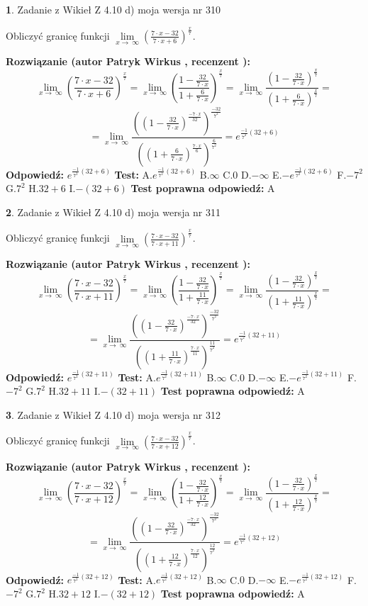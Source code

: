 \documentclass[12pt, a4paper]{article}
\theoremstyle{definition} %
\newtheorem{zad}{}
\newcommand{\zadStart}[1]{\begin{zad}#1\newline}
\newcommand{\zadStop}{\end{zad}}
\newcommand{\rozwStart}[2]{\noindent \textbf{Rozwiązanie (autor #1 , recenzent #2): }\newline}
\newcommand{\rozwStop}{\newline}
\newcommand{\odpStart}{\noindent \textbf{Odpowiedź:}\newline}
\newcommand{\odpStop}{\newline}
\newcommand{\testStart}{\noindent \textbf{Test:}\newline}
\newcommand{\testStop}{\newline}
\newcommand{\kluczStart}{\noindent \textbf{Test poprawna odpowiedź:}\newline}
\newcommand{\kluczStop}{\newline}
\begin{document}
\zadStart{Zadanie z Wikieł Z 4.10 d) moja wersja nr 310}


Obliczyć granicę funkcji  $\lim\limits_{x\to\ \infty}(\frac{7\cdot x-32}{7\cdot x+6})^{\frac{x}{7}}$.
\zadStop
\rozwStart{Patryk Wirkus}{}
$$\lim\limits_{x\to\ \infty}(\frac{7\cdot x-32}{7\cdot x+6})^{\frac{x}{7}} = \lim\limits_{x\to\ \infty}(\frac{1-\frac{32}{7\cdot x}}{1+\frac{6}{7\cdot x}})^{\frac{x}{7}}=\lim\limits_{x\to\ \infty}\frac{(1-\frac{32}{7\cdot x})^{\frac{x}{7}}}{(1+\frac{6}{7\cdot x})^{\frac{x}{7}}}=$$
$$=\lim\limits_{x\to\ \infty}\frac{((1-\frac{32}{7\cdot x})^{\frac{-7\cdot x}{32}})^{\frac{-32}{7^{2}}}}{((1+\frac{6}{7\cdot x})^{\frac{7\cdot x}{6}})^{\frac{6}{7^{2}}}}=e^{\frac{-1}{7^{2}}(32+6)}$$
\rozwStop
\odpStart
$e^{\frac{-1}{7^{2}}(32+6)}$
\odpStop
\testStart
A.$e^{\frac{-1}{7^{2}}(32+6)}$ B.$\infty$ C.$0$ D.$-\infty$ E.$-e^{\frac{-1}{7^{2}}(32+6)}$
F.$-7^{2}$ G.$7^{2}$
H.$32+6$
I.$-(32+6)$
\testStop
\kluczStart
A
\kluczStop



\zadStart{Zadanie z Wikieł Z 4.10 d) moja wersja nr 311}


Obliczyć granicę funkcji  $\lim\limits_{x\to\ \infty}(\frac{7\cdot x-32}{7\cdot x+11})^{\frac{x}{7}}$.
\zadStop
\rozwStart{Patryk Wirkus}{}
$$\lim\limits_{x\to\ \infty}(\frac{7\cdot x-32}{7\cdot x+11})^{\frac{x}{7}} = \lim\limits_{x\to\ \infty}(\frac{1-\frac{32}{7\cdot x}}{1+\frac{11}{7\cdot x}})^{\frac{x}{7}}=\lim\limits_{x\to\ \infty}\frac{(1-\frac{32}{7\cdot x})^{\frac{x}{7}}}{(1+\frac{11}{7\cdot x})^{\frac{x}{7}}}=$$
$$=\lim\limits_{x\to\ \infty}\frac{((1-\frac{32}{7\cdot x})^{\frac{-7\cdot x}{32}})^{\frac{-32}{7^{2}}}}{((1+\frac{11}{7\cdot x})^{\frac{7\cdot x}{11}})^{\frac{11}{7^{2}}}}=e^{\frac{-1}{7^{2}}(32+11)}$$
\rozwStop
\odpStart
$e^{\frac{-1}{7^{2}}(32+11)}$
\odpStop
\testStart
A.$e^{\frac{-1}{7^{2}}(32+11)}$ B.$\infty$ C.$0$ D.$-\infty$ E.$-e^{\frac{-1}{7^{2}}(32+11)}$
F.$-7^{2}$ G.$7^{2}$
H.$32+11$
I.$-(32+11)$
\testStop
\kluczStart
A
\kluczStop



\zadStart{Zadanie z Wikieł Z 4.10 d) moja wersja nr 312}


Obliczyć granicę funkcji  $\lim\limits_{x\to\ \infty}(\frac{7\cdot x-32}{7\cdot x+12})^{\frac{x}{7}}$.
\zadStop
\rozwStart{Patryk Wirkus}{}
$$\lim\limits_{x\to\ \infty}(\frac{7\cdot x-32}{7\cdot x+12})^{\frac{x}{7}} = \lim\limits_{x\to\ \infty}(\frac{1-\frac{32}{7\cdot x}}{1+\frac{12}{7\cdot x}})^{\frac{x}{7}}=\lim\limits_{x\to\ \infty}\frac{(1-\frac{32}{7\cdot x})^{\frac{x}{7}}}{(1+\frac{12}{7\cdot x})^{\frac{x}{7}}}=$$
$$=\lim\limits_{x\to\ \infty}\frac{((1-\frac{32}{7\cdot x})^{\frac{-7\cdot x}{32}})^{\frac{-32}{7^{2}}}}{((1+\frac{12}{7\cdot x})^{\frac{7\cdot x}{12}})^{\frac{12}{7^{2}}}}=e^{\frac{-1}{7^{2}}(32+12)}$$
\rozwStop
\odpStart
$e^{\frac{-1}{7^{2}}(32+12)}$
\odpStop
\testStart
A.$e^{\frac{-1}{7^{2}}(32+12)}$ B.$\infty$ C.$0$ D.$-\infty$ E.$-e^{\frac{-1}{7^{2}}(32+12)}$
F.$-7^{2}$ G.$7^{2}$
H.$32+12$
I.$-(32+12)$
\testStop
\kluczStart
A
\kluczStop
\end{document}
